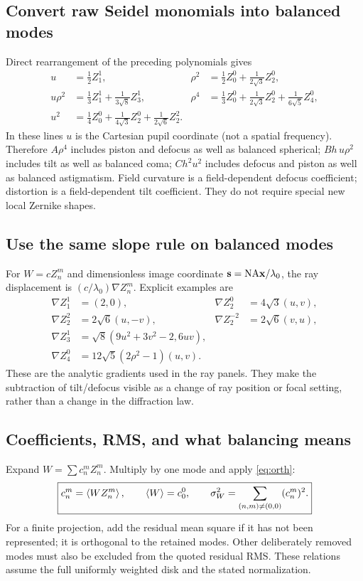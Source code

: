 \subsection{Convert raw Seidel monomials into balanced modes}
Direct rearrangement of the preceding polynomials gives
\begin{align}
u&=\tfrac12 Z_1^1,&
\rho^2&=\tfrac12 Z_0^0+\tfrac1{2\sqrt3}Z_2^0,\\
u\rho^2&=\tfrac13 Z_1^1+\tfrac1{3\sqrt8}Z_3^1,&
\rho^4&=\tfrac13 Z_0^0+\tfrac1{2\sqrt3}Z_2^0+\tfrac1{6\sqrt5}Z_4^0,\\
u^2&=\tfrac14 Z_0^0+\tfrac1{4\sqrt3}Z_2^0+\tfrac1{2\sqrt6}Z_2^2.
\end{align}
In these lines $u$ is the Cartesian pupil coordinate (not a spatial frequency). Therefore $A\rho^4$ includes piston and defocus as well as balanced spherical; $Bh\,u\rho^2$ includes tilt as well as balanced coma; $Ch^2u^2$ includes defocus and piston as well as balanced astigmatism. Field curvature is a field-dependent defocus coefficient; distortion is a field-dependent tilt coefficient. They do not require special new local Zernike shapes.

\subsection{Use the same slope rule on balanced modes}
For $W=cZ_n^m$ and dimensionless image coordinate $\mathbf s=\mathrm{NA}\mathbf x/\lambda_0$, the ray displacement is $(c/\lambda_0)\nabla Z_n^m$. Explicit examples are
\begin{align}
\nabla Z_1^1&=(2,0),&
\nabla Z_2^0&=4\sqrt3(u,v),\\
\nabla Z_2^2&=2\sqrt6(u,-v),&
\nabla Z_2^{-2}&=2\sqrt6(v,u),\\
\nabla Z_3^1&=\sqrt8(9u^2+3v^2-2,6uv),\\
\nabla Z_4^0&=12\sqrt5(2\rho^2-1)(u,v).
\end{align}
These are the analytic gradients used in the ray panels. They make the subtraction of tilt/defocus visible as a change of ray position or focal setting, rather than a change in the diffraction law.

\subsection{Coefficients, RMS, and what balancing means}
Expand $W=\sum c_n^mZ_n^m$. Multiply by one mode and apply \eqref{eq:orth}:
\begin{equation}
\boxed{c_n^m=\left\langle WZ_n^m\right\rangle,\qquad
\left\langle W\right\rangle=c_0^0,\qquad
\sigma_W^2=\sum_{(n,m)\ne(0,0)}(c_n^m)^2.}
\end{equation}
For a finite projection, add the residual mean square if it has not been represented; it is orthogonal to the retained modes. Other deliberately removed modes must also be excluded from the quoted residual RMS. These relations assume the full uniformly weighted disk and the stated normalization.

